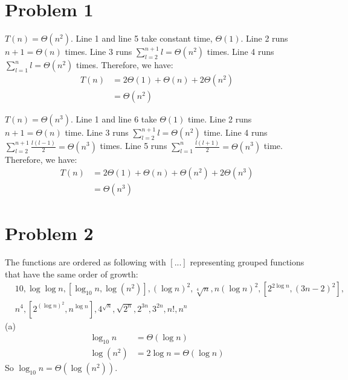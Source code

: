 \documentclass[twoside,11pt]{homework}
\date{\today} %
\begin{document}
\maketitle

\section*{Problem 1}


$T(n) = \Theta{(n^2)}$.
Line 1 and line 5 take constant time, $\Theta(1)$.
Line 2 runs $n+1 = \Theta (n)$ times.
Line 3 runs $\sum_{l=2}^{n+1} l = \Theta (n^2)$ times.
Line 4 runs $\sum_{l=1}^{n} l = \Theta (n^2)$ times.
Therefore, we have:
%
\begin{equation}
\begin{split}
T(n) &= 2\Theta(1) + \Theta(n) + 2\Theta(n^2) \\
     &= \Theta(n^2)
\end{split}
\end{equation}
%

$T(n) = \Theta (n^3) $.
Line 1 and line 6 take $\Theta(1)$ time.
Line 2 runs $n + 1 = \Theta(n)$ time.
Line 3 runs $\sum_{l=2}^{n+1} l  = \Theta(n^2)$ time.
Line 4 runs $\sum_{l=2}^{n+1} \frac{l(l-1)}{2} = \Theta(n^3)$ times. 
Line 5 runs  $\sum_{l=1}^{n} \frac{l(l+1)}{2} = \Theta(n^3)$ time.
Therefore, we have:
%
\begin{equation}
\begin{split}
T(n) &= 2\Theta(1) + \Theta(n) + \Theta(n^2) + 2\Theta(n^3) \\
     &= \Theta(n^3)
\end{split}
\end{equation}

\section*{Problem 2}
The functions are ordered as following with $[...]$ representing grouped functions that have the same order of growth:
%
\begin{equation}
\begin{split}
& 10, \log \log n, [\log_{10} n, \log (n^2)], (\log n)^2, \sqrt[4]{n}, n (\log n)^2, [2^{2 \log n}, (3n-2)^2], \\
& n^4, [2^{(\log n)^2}, n^{\log n}], 4^{\sqrt{n}}, \sqrt{2^n}, 2^{3n}, 3^{2n}, n!, n^n
\end{split}
\end{equation}
\noindent (a)
%
\begin{equation}
\begin{split}
    \log_{10} n &= \Theta (\log n) \\
    \log (n^2) &= 2 \log n = \Theta (\log n)
\end{split}
\end{equation}
%
So $\log_{10} n = \Theta(\log (n^2))$.
\end{document}
